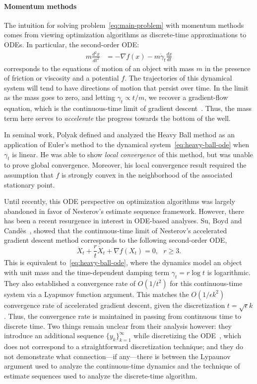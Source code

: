 \documentclass[11pt]{article}
\theoremstyle{plain}
\begin{document}
\paragraph{Momentum methods}
The intuition for solving problem~\eqref{eq:main-problem} with momentum methods comes from viewing optimization algorithms as discrete-time approximations to ODEs. In particular, the second-order ODE:
 \begin{align}\label{eq:heavy-ball-ode}
 m \frac{d^2x}{dt^2}& = - \nabla f(x) - m \dot \gamma_t \frac{dx}{dt}
 \end{align}
corresponds to the equations of motion of an object with mass $m$ in the presence of  friction or viscosity and a potential $f$. The trajectories of this dynamical system will tend to have directions of motion that persist over time.  In the limit as the mass goes to zero, and letting $\gamma_t \propto t/m$, we recover a gradient-flow equation, which is the continuous-time limit of gradient descent~\cite{Acceleration}.  Thus, the mass term here serves to \emph{accelerate} the progress towards the bottom of the well. 

In seminal work, Polyak defined and analyzed the Heavy Ball method as an application of Euler's method to the dynamical system~\eqref{eq:heavy-ball-ode} when $\gamma_t$ is linear.  He was able to show \emph{local convergence} of this method, but was unable to prove global convergence.  Moreover, his local convergence result required the assumption that $f$ is strongly convex in the neighborhood of the associated stationary point.

Until recently, this ODE perspective on optimization algorithms was largely abandoned in favor of Nesterov's estimate sequence framework.  However, there has been a recent resurgence in interest in ODE-based analyses.  Su, Boyd and Cand\`es~\cite{SuBoydCandes14}, showed that the continuous-time limit of Nesterov's accelerated gradient descent method corresponds to the following second-order ODE, 
 \begin{equation}\label{Eq:SuBoydCandes}
 \ddot X_t + \frac{r}{t} \dot X_t + \nabla f(X_t) = 0,\,\,\,\,r \geq 3.
 \end{equation}
This is equivalent to~\eqref{eq:heavy-ball-ode}, where the dynamics model an object with unit mass and the time-dependent damping term $\gamma_t = r\log t$ is logarithmic.  They also established a convergence rate of $O(1/t^2)$ for this continuous-time system via a Lyapunov function argument. This matches the $O(1/\epsilon k^2)$ convergence rate of accelerated gradient descent, given the discretization $t= \sqrt\epsilon k$. Thus, the convergence rate is maintained in passing from continuous time to discrete time. Two things remain unclear from their analysis however:  they introduce an additional sequence $\{y_k\}_{k=1}^\infty$ while discretizing the ODE~\cite[Sec 2]{Acceleration},  which does not correspond to a straightforward discretization technique; and they do not demonstrate what connection---if any---there is between the Lypaunov argument used to analyze the continuous-time dynamics and the technique of estimate sequences used to analyze the discrete-time algorithm. 
\end{document}
